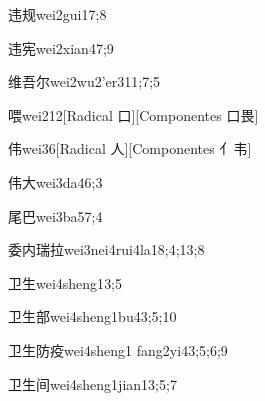 \begin{verbete}{违规}{wei2gui1}{7;8}
\end{verbete}

\begin{verbete}{违宪}{wei2xian4}{7;9}
\end{verbete}

\begin{verbete}{维吾尔}{wei2wu2'er3}{11;7;5}
\end{verbete}

\begin{verbete}{喂}{wei2}{12}[Radical 口][Componentes 口畏]
\end{verbete}

\begin{verbete}{伟}{wei3}{6}[Radical 人][Componentes 亻韦]
\end{verbete}

\begin{verbete}{伟大}{wei3da4}{6;3}
\end{verbete}

\begin{verbete}{尾巴}{wei3ba5}{7;4}
\end{verbete}

\begin{verbete}{委内瑞拉}{wei3nei4rui4la1}{8;4;13;8}
\end{verbete}

\begin{verbete}{卫生}{wei4sheng1}{3;5}
\end{verbete}

\begin{verbete}{卫生部}{wei4sheng1bu4}{3;5;10}
\end{verbete}

\begin{verbete}{卫生防疫}{wei4sheng1 fang2yi4}{3;5;6;9}
\end{verbete}

\begin{verbete}{卫生间}{wei4sheng1jian1}{3;5;7}
\end{verbete}

